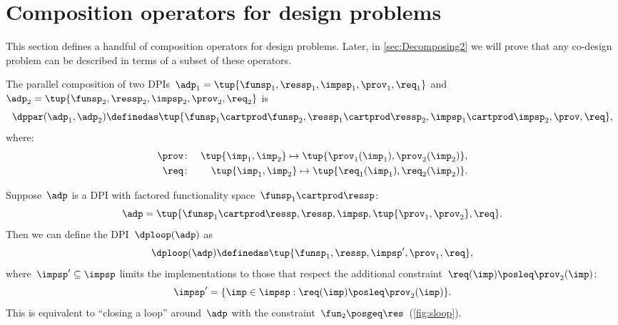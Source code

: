 

\section{Composition operators for design problems}

This section defines a handful of composition operators for design
problems. Later, in \cref{sec:Decomposing2} we will prove that any co-design
problem can be described in terms of a subset of these operators.

\label{sec:threeoperators}

\begin{definition}[$\dppar$]
    \label{def:parallel}
    The parallel composition of two DPIs~$\adp_{1}=\tup{\funsp_{1},\ressp_{1},\impsp_{1},\prov_{1},\req_{1}}$
    and~$\adp_{2}=\tup{\funsp_{2},\ressp_{2},\impsp_{2},\prov_{2},
        \req_{2}}$ is
    \begin{equation*}
        \dppar(\adp_{1},\adp_{2})\definedas\tup{\funsp_{1}\cartprod\funsp_{2},\ressp_{1}\cartprod\ressp_{2},\impsp_{1}\cartprod\impsp_{2},\prov,\req} ,
    \end{equation*}
    where:
    \begin{eqnarray}
        \prov & \colon & \tup{ \imp_{1},\imp_{2}} \mapsto \tup{\prov_{1}(\imp_{1}),\prov_{2}(\imp_{2})} ,\label{eq:dppar-exec}\\
        \req & \colon & \tup{ \imp_{1},\imp_{2}}\mapsto\tup{\req_{1}(\imp_{1}),\req_{2}(\imp_{2})} .\nonumber
    \end{eqnarray}

\end{definition}


\begin{definition}[$\dploop$]
    \label{def:dp_loop}Suppose~$\adp$ is a DPI with factored functionality
    space~$\funsp_{1}\cartprod\ressp$:
    \begin{equation*}
        \adp=\tup{ \funsp_{1}\cartprod\ressp,\ressp,\impsp,\tup{ \prov_{1},\prov_{2}} ,\req}.
    \end{equation*}
    Then we can define the DPI~$\dploop(\adp)$ as
    \begin{equation*}
        \dploop(\adp)\definedas\tup{ \funsp_{1},\ressp,\impsp',\prov_{1},\req} ,
    \end{equation*}
    where~$\impsp'\subseteq\impsp$ limits the implementations to those
    that respect the additional constraint~$\req(\imp)\posleq\prov_{2}(\imp)$:
    \begin{equation*}
        \impsp'=\{\imp\in\impsp:\req(\imp)\posleq\prov_{2}(\imp)\}.
    \end{equation*}
    This is equivalent to ``closing a loop'' around~$\adp$ with
    the constraint~$\fun_{2}\posgeq\res$~(\cref{fig:sloop}).
\end{definition}

